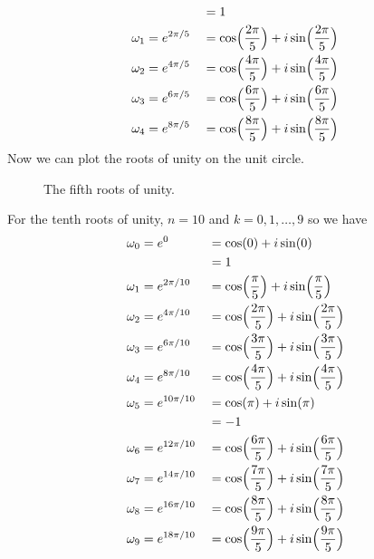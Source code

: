\begin{enumerate}
\begin{alignat*}{2}
    & &&{}= 1\\
    \omega_1 & = e^{2\pi/5} &&{}=
    \cos\Bigl(\frac{2\pi}{5}\Bigr) + i\sin\Bigl(\frac{2\pi}{5}\Bigr)\\
    \omega_2 & = e^{4\pi/5} &&{}=
    \cos\Bigl(\frac{4\pi}{5}\Bigr) + i\sin\Bigl(\frac{4\pi}{5}\Bigr)\\
    \omega_3 & = e^{6\pi/5} &&{}=
    \cos\Bigl(\frac{6\pi}{5}\Bigr) + i\sin\Bigl(\frac{6\pi}{5}\Bigr)\\
    \omega_4 & = e^{8\pi/5} &&{}=
    \cos\Bigl(\frac{8\pi}{5}\Bigr) + i\sin\Bigl(\frac{8\pi}{5}\Bigr)\\
  \end{alignat*}
  Now we can plot the roots of unity on the unit circle.
  \begin{figure}[H]
    \centering
    
    \caption{The fifth roots of unity.}
  \end{figure}
  For the tenth roots of unity, \(n = 10\) and \(k = 0,1,\ldots, 9\) so we have
  \begin{alignat*}{2}
    \omega_0 & = e^0 &&{}= \cos(0) + i\sin(0)\\
    & &&{}= 1\\
    \omega_1 & = e^{2\pi/10} &&{}=
    \cos\Bigl(\frac{\pi}{5}\Bigr) + i\sin\Bigl(\frac{\pi}{5}\Bigr)\\
    \omega_2 & = e^{4\pi/10} &&{}=
    \cos\Bigl(\frac{2\pi}{5}\Bigr) + i\sin\Bigl(\frac{2\pi}{5}\Bigr)\\
    \omega_3 & = e^{6\pi/10} &&{}=
    \cos\Bigl(\frac{3\pi}{5}\Bigr) + i\sin\Bigl(\frac{3\pi}{5}\Bigr)\\
    \omega_4 & = e^{8\pi/10} &&{}=
    \cos\Bigl(\frac{4\pi}{5}\Bigr) + i\sin\Bigl(\frac{4\pi}{5}\Bigr)\\
    \omega_5 & = e^{10\pi/10} &&{}= \cos(\pi) + i\sin(\pi)\\
    & &&{}= -1\\
    \omega_6 & = e^{12\pi/10} &&{}=
    \cos\Bigl(\frac{6\pi}{5}\Bigr) + i\sin\Bigl(\frac{6\pi}{5}\Bigr)\\
    \omega_7 & = e^{14\pi/10} &&{}=
    \cos\Bigl(\frac{7\pi}{5}\Bigr) + i\sin\Bigl(\frac{7\pi}{5}\Bigr)\\
    \omega_8 & = e^{16\pi/10} &&{}=
    \cos\Bigl(\frac{8\pi}{5}\Bigr) + i\sin\Bigl(\frac{8\pi}{5}\Bigr)\\
    \omega_9 & = e^{18\pi/10} &&{}=
    \cos\Bigl(\frac{9\pi}{5}\Bigr) + i\sin\Bigl(\frac{9\pi}{5}\Bigr)
  \end{alignat*}

\end{enumerate}

